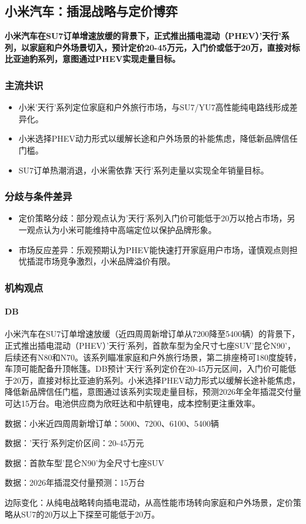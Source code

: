\documentclass[11pt]{ctexart}
\begin{document}
\subsection{小米汽车：插混战略与定价博弈}
\textbf{小米汽车在SU7订单增速放缓的背景下，正式推出插电混动（PHEV）'天行'系列，以家庭和户外场景切入，预计定价20-45万元，入门价或低于20万，直接对标比亚迪豹系列，意图通过PHEV实现走量目标。}
\subsubsection*{主流共识}
\begin{itemize}
  \item 小米'天行'系列定位家庭和户外旅行市场，与SU7/YU7高性能纯电路线形成差异化。
  \item 小米选择PHEV动力形式以缓解长途和户外场景的补能焦虑，降低新品牌信任门槛。
  \item SU7订单热潮消退，小米需依靠'天行'系列走量以实现全年销量目标。
\end{itemize}
\subsubsection*{分歧与条件差异}
\begin{itemize}
  \item 定价策略分歧：部分观点认为'天行'系列入门价可能低于20万以抢占市场，另一观点认为小米可能维持中高端定位以保护品牌形象。
  \item 市场反应差异：乐观预期认为PHEV能快速打开家庭用户市场，谨慎观点则担忧插混市场竞争激烈，小米品牌溢价有限。
\end{itemize}
\subsubsection*{机构观点}
\paragraph{DB} 小米汽车在SU7订单增速放缓（近四周周新增订单从7200降至5400辆）的背景下，正式推出插电混动（PHEV）'天行'系列，首款车型为全尺寸七座SUV'昆仑N90'，后续还有N80和N70。该系列瞄准家庭和户外旅行场景，第二排座椅可180度旋转，车顶可能配备升顶帐篷。DB预计'天行'系列定价在20-45万元区间，入门价可能低于20万，直接对标比亚迪豹系列。小米选择PHEV动力形式以缓解长途补能焦虑，降低新品牌信任门槛，意图通过该系列实现走量目标，预测2026年全年插混交付量可达15万台。电池供应商为欣旺达和中航锂电，成本控制更注重效率。
{\small\color{refgray}数据：小米近四周周新增订单：5000、7200、6100、5400辆\par}
{\small\color{refgray}数据：'天行'系列定价区间：20-45万元\par}
{\small\color{refgray}数据：首款车型'昆仑N90'为全尺寸七座SUV\par}
{\small\color{refgray}数据：2026年插混交付量预测：15万台\par}
{\small\color{refgray}边际变化：从纯电战略转向插电混动，从高性能市场转向家庭和户外场景，定价策略从SU7的20万以上下探至可能低于20万。\par}
\end{document}
